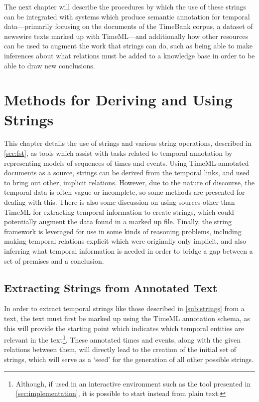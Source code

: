 \documentclass[a4paper,12pt,leqno,twoside]{article}
\begin{document}
The next chapter will describe the procedures by which the use of these strings can be integrated with systems which produce semantic annotation for temporal data---primarily focusing on the documents of the TimeBank corpus, a dataset of newswire texts marked up with TimeML---and additionally how other resources can be used to augment the work that strings can do, such as being able to make inferences about what relations must be added to a knowledge base in order to be able to draw new conclusions.

\newpage
\section{Methods for Deriving and Using Strings}\label{sec:methods}
This chapter details the use of strings and various string operations, described in \cref{sec:fst}, as tools which assist with tasks related to temporal annotation by representing models of sequences of times and events. Using TimeML-annotated documents as a source, strings can be derived from the temporal links, and used to bring out other, implicit relations. However, due to the nature of discourse, the temporal data is often vague or incomplete, so some methods are presented for dealing with this. There is also some discussion on using sources other than TimeML for extracting temporal information to create strings, which could potentially augment the data found in a marked up file. Finally, the string framework is leveraged for use in some kinds of reasoning problems, including making temporal relations explicit which were originally only implicit, and also inferring what temporal information is needed in order to bridge a gap between a set of premises and a conclusion.

\subsection{Extracting Strings from Annotated Text}\label{sub:extracting}
In order to extract temporal strings like those described in \cref{sub:strings} from a text, the text must first be marked up using the TimeML \citep{timeml2005timeml} annotation schema, as this will provide the starting point which indicates which temporal entities are relevant in the text\footnote{Although, if used in an interactive environment such as the tool presented in \cref{sec:implementation}, it is possible to start instead from plain text.}. These annotated times and events, along with the given relations between them, will directly lead to the creation of the initial set of strings, which will serve as a `seed' for the generation of all other possible strings.
\end{document}
